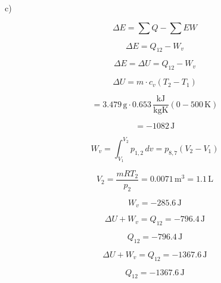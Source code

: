 c)

\[
\Delta E = \sum Q - \sum EW
\]

\[
\Delta E = Q_{12} - W_v
\]

\[
\Delta E = \Delta U = Q_{12} - W_v
\]

\[
\Delta U = m \cdot c_v (T_2 - T_1)
\]

\[
= 3.479 \, \text{g} \cdot 0.653 \, \frac{\text{kJ}}{\text{kgK}} (0 - 500 \, \text{K})
\]

\[
= -1082 \, \text{J}
\]

\[
W_v = \int_{V_1}^{V_2} p_{1,2} \, dv = p_{8,7} (V_2 - V_1)
\]

\[
V_2 = \frac{mRT_2}{p_2} = 0.0071 \, \text{m}^3 = 1.1 \, \text{L}
\]

\[
W_v = -285.6 \, \text{J}
\]

\[
\Delta U + W_v = Q_{12} = -796.4 \, \text{J}
\]

\[
Q_{12} = -796.4 \, \text{J}
\]

\[
\Delta U + W_v = Q_{12} = -1367.6 \, \text{J}
\]

\[
Q_{12} = -1367.6 \, \text{J}
\]
